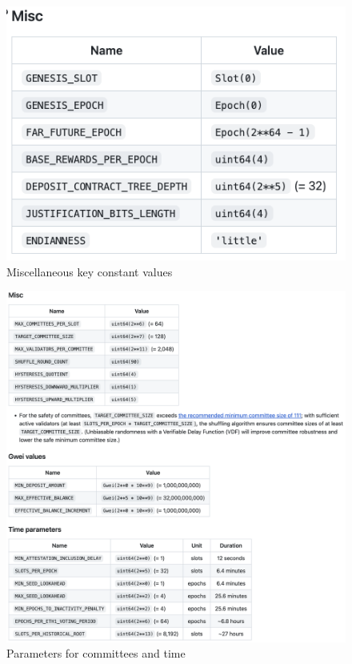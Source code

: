 \documentclass[UTF8]{article}
\begin{document}
\begin{figure}[htbp]
\begin{center}
\includegraphics[width=0.4\linewidth]{images/constants}
\caption{Miscellaneous key constant values}
\label{fig:constants}
\end{center}
\end{figure}

\begin{figure}[htbp]
\begin{center}
\includegraphics[width=0.9\linewidth]{images/committee}
\caption{Parameters for committees and time}
\label{fig:committee}
\end{center}
\end{figure}
\end{document}
